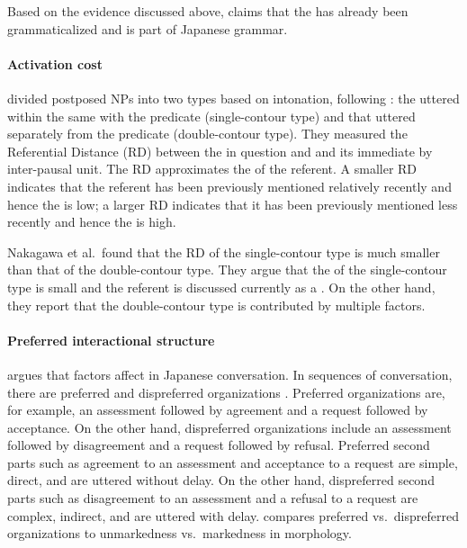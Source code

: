 Based on the evidence discussed above,
 claims that the  has already been grammaticalized and is part of Japanese grammar.


\paragraph{Activation cost}

 divided postposed NPs into two types
based on intonation,
following :
the  uttered within the same  with the predicate (single-contour type) and
that uttered separately from the predicate (double-contour type).
They measured the Referential Distance (RD) between the  in question and and its immediate  by inter-pausal unit.
The RD approximates the  of the referent.
A smaller RD indicates that the referent has been previously mentioned relatively recently and hence the  is low;
a larger RD indicates that it has been previously mentioned less recently
and hence the  is high.

Nakagawa et al.~found that
the RD of the single-contour type is much smaller than that of the double-contour type.
They argue that the  of the single-contour type is small
and the referent is discussed currently as a .
On the other hand, they report that the double-contour type is contributed by multiple factors.


\paragraph{Preferred {interactional} structure}

 argues that
 factors affect  in Japanese conversation.
In sequences of conversation,
there are preferred and dispreferred organizations \cite{schegloffetal77,heritage84,pomerantz84}.
Preferred organizations are, for example,
an assessment followed by agreement and a request followed by acceptance.
On the other hand,
dispreferred organizations include
an assessment followed by disagreement and a request followed by refusal.
Preferred second parts such as agreement to an assessment and acceptance to a request are simple, direct, and are uttered without delay.
On the other hand,
dispreferred second parts such as disagreement to an assessment and a refusal to a request are complex, indirect, and are uttered with delay.
 compares preferred vs.~dispreferred organizations to unmarkedness vs.~markedness in morphology.

